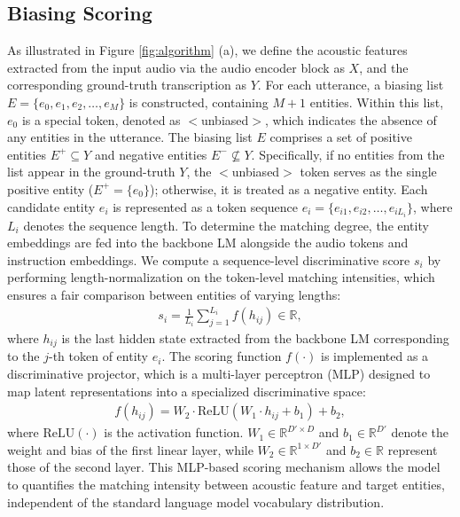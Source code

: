 \documentclass[cameraready]{Interspeech}
\begin{document}
\subsection{Biasing Scoring}
As illustrated in Figure \ref{fig:algorithm} (a), we define the acoustic features extracted from the input audio via the audio encoder block as $X$, and the corresponding ground-truth transcription as $Y$.
%
For each utterance, a biasing list $E=\{e_0, e_1, e_2, \dots, e_M\}$ is constructed, containing $M+1$ entities.
%
Within this list, $e_0$ is a special token, denoted as $<$unbiased$>$, which indicates the absence of any entities in the utterance.
%
The biasing list $E$ comprises a set of positive entities $E^+ \subseteq Y$ and negative entities $E^- \not\subseteq Y$.
%
Specifically, if no entities from the list appear in the ground-truth $Y$, the $<$unbiased$>$ token serves as the single positive entity ($E^+=\{e_0\}$); otherwise, it is treated as a negative entity.
%
Each candidate entity $e_i$ is represented as a token sequence $e_i=\{e_{i1}, e_{i2}, \dots, e_{iL_i}\}$, where $L_i$ denotes the sequence length.
%
To determine the matching degree, the entity embeddings are fed into the backbone LM alongside the audio tokens and instruction embeddings.
%
We compute a sequence-level discriminative score $s_i$ by performing length-normalization on the token-level matching intensities, which ensures a fair comparison between entities of varying lengths:
%
\begin{align}
  s_i=\frac{1}{L_i} \sum_{j=1}^{L_i} f(h_{ij}) \in \mathbb{R},
  \label{equation:score}
\end{align}
%
where $h_{ij}$ is the last hidden state extracted from the backbone LM corresponding to the $j$-th token of entity $e_i$.
%
The scoring function $f(\cdot)$ is implemented as a discriminative projector, which is a multi-layer perceptron (MLP) designed to map latent representations into a specialized discriminative space:
%
\begin{align}
  f(h_{ij})=W_2 \cdot \text{ReLU}(W_1 \cdot h_{ij} + b_1) + b_2,
\end{align}
%
where $\text{ReLU}(\cdot)$ is the activation function.
%
$W_1 \in \mathbb{R}^{D' \times D}$ and $b_1 \in \mathbb{R}^{D'}$ denote the weight and bias of the first linear layer, while $W_2 \in \mathbb{R}^{1 \times D'}$ and $b_2 \in \mathbb{R}$ represent those of the second layer.
%
This MLP-based scoring mechanism allows the model to quantifies the matching intensity between acoustic feature and target entities, independent of the standard language model vocabulary distribution.
\end{document}
